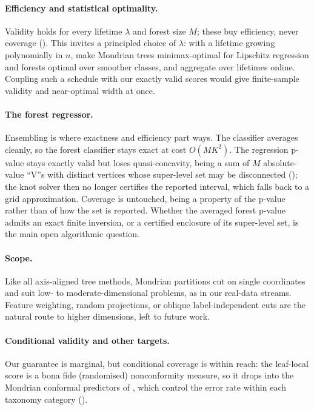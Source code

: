 \documentclass[twoside]{article}
\numberwithin{equation}{section}
\theoremstyle{plain}
\theoremstyle{definition}
\theoremstyle{remark}
\begin{document}
\paragraph{Efficiency and statistical optimality.}
Validity holds for every lifetime $\lambda$ and forest size $M$; these buy efficiency, never
coverage (). This invites a principled choice of
$\lambda$: with a lifetime growing polynomially in $n$, \citet{mourtada2020minimax} make
Mondrian trees minimax-optimal for Lipschitz regression and forests optimal over smoother
classes, and \citet{mourtada2021amf} aggregate over lifetimes online. Coupling such a
schedule with our exactly valid scores would give finite-sample validity and near-optimal
width at once.

\paragraph{The forest regressor.}
Ensembling is where exactness and efficiency part ways. The classifier averages cleanly, so
the forest classifier stays exact at cost $O(MK^2)$. The regression p-value stays exactly
valid but loses quasi-concavity, being a sum of $M$ absolute-value ``V''s with distinct
vertices whose super-level set may be disconnected (); the knot
solver then no longer certifies the reported interval, which falls back to a grid
approximation. Coverage is untouched, being a property of the p-value rather than of how the
set is reported. Whether the averaged forest p-value admits an exact finite inversion, or a
certified enclosure of its super-level set, is the main open algorithmic question.

\paragraph{Scope.}
Like all axis-aligned tree methods, Mondrian partitions cut on single coordinates and suit
low- to moderate-dimensional problems, as in our real-data streams. Feature weighting,
random projections, or oblique label-independent cuts are the natural route to higher
dimensions, left to future work.

\paragraph{Conditional validity and other targets.}
Our guarantee is marginal, but conditional coverage is within reach: the leaf-local score is
a bona fide (randomised) nonconformity measure, so it drops into the Mondrian conformal
predictors of \citet[\S4.6]{alrw2}, which control the error rate within each taxonomy
category ().
\end{document}
